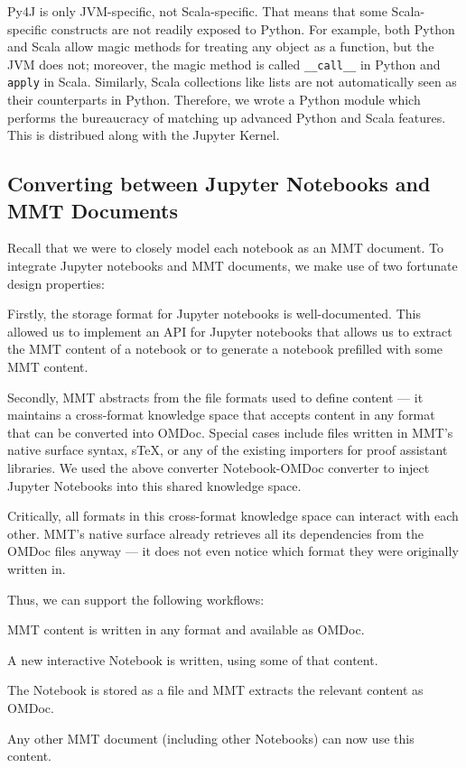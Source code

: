Py4J is only JVM-specific, not Scala-specific.
That means that some Scala-specific constructs are not readily exposed to Python.
For example, both Python and Scala allow magic methods for treating any object as a function, but the JVM does not; moreover, the magic method is called \texttt{\_\_call\_\_} in Python and \texttt{apply} in Scala.
Similarly, Scala collections like lists are not automatically seen as their counterparts in Python.
Therefore, we wrote a Python module which performs the bureaucracy of matching up advanced Python and Scala features.
This is distribued along with the Jupyter Kernel. 

\subsection{Converting between Jupyter Notebooks and MMT Documents}\label{sec:kernel:mapping}

Recall that we were to closely model each notebook as an MMT document. 
To integrate Jupyter notebooks and MMT documents, we make use of two fortunate design properties:

Firstly, the storage format \cite{nbformat:on} for Jupyter notebooks is well-documented. 
This allowed us to implement an API for Jupyter notebooks that allows us to extract the MMT content of a notebook or to generate a notebook prefilled with some MMT content.

Secondly, MMT abstracts from the file formats used to define content --- it maintains a cross-format knowledge space that accepts content in any format that can be converted into OMDoc.
Special cases include files written in MMT's native surface syntax, sTeX, or any of the existing importers for proof assistant libraries.
We used the above converter Notebook-OMDoc converter to inject Jupyter Notebooks into this shared knowledge space.

Critically, all formats in this cross-format knowledge space can interact with each other.
MMT's native surface already retrieves all its dependencies from the OMDoc files anyway --- it does not even notice which format they were originally written in.

Thus, we can support the following workflows:
\begin{compactenum}
 \item MMT content is written in any format and available as OMDoc.
 \item A new interactive Notebook is written, using some of that content.
 \item The Notebook is stored as a file and MMT extracts the relevant content as OMDoc.
 \item Any other MMT document (including other Notebooks) can now use this content.
\end{compactenum}

